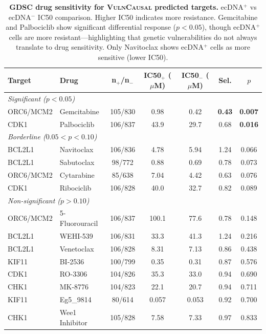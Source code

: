 \documentclass{article}
\newcommand{\vulncausal}{\textsc{VulnCausal}}
\begin{document}
\begin{table}[H]
\caption{\textbf{GDSC drug sensitivity for \vulncausal{} predicted targets.} ecDNA$^+$ vs ecDNA$^-$ IC50 comparison. Higher IC50 indicates more resistance. Gemcitabine and Palbociclib show significant differential response ($p < 0.05$), though ecDNA$^+$ cells are more resistant---highlighting that genetic vulnerabilities do not always translate to drug sensitivity. Only Navitoclax shows ecDNA$^+$ cells as more sensitive (lower IC50).}
\label{tab:gdsc_full}
\centering
\small
\begin{tabular}{@{}llccccc@{}}
\toprule
Target & Drug & n$_{+}$/n$_{-}$ & IC50$_{+}$ ($\mu$M) & IC50$_{-}$ ($\mu$M) & Sel. & $p$ \\
\midrule
\multicolumn{7}{l}{\textit{Significant ($p < 0.05$)}} \\
ORC6/MCM2 & Gemcitabine & 105/830 & 0.98 & 0.42 & \textbf{0.43} & \textbf{0.007} \\
CDK1 & Palbociclib & 106/837 & 43.9 & 29.7 & 0.68 & \textbf{0.016} \\
\midrule
\multicolumn{7}{l}{\textit{Borderline ($0.05 < p < 0.10$)}} \\
BCL2L1 & Navitoclax & 106/836 & 4.78 & 5.94 & 1.24 & 0.066 \\
BCL2L1 & Sabutoclax & 98/772 & 0.88 & 0.69 & 0.78 & 0.073 \\
ORC6/MCM2 & Cytarabine & 85/638 & 7.04 & 4.42 & 0.63 & 0.076 \\
CDK1 & Ribociclib & 106/828 & 40.0 & 32.7 & 0.82 & 0.089 \\
\midrule
\multicolumn{7}{l}{\textit{Non-significant ($p > 0.10$)}} \\
ORC6/MCM2 & 5-Fluorouracil & 106/837 & 100.1 & 77.6 & 0.78 & 0.148 \\
BCL2L1 & WEHI-539 & 106/831 & 33.3 & 41.3 & 1.24 & 0.216 \\
BCL2L1 & Venetoclax & 106/828 & 8.31 & 7.13 & 0.86 & 0.438 \\
KIF11 & BI-2536 & 100/799 & 0.35 & 0.31 & 0.87 & 0.576 \\
CDK1 & RO-3306 & 104/826 & 35.3 & 33.0 & 0.94 & 0.690 \\
CHK1 & MK-8776 & 104/823 & 22.1 & 20.7 & 0.94 & 0.711 \\
KIF11 & Eg5\_9814 & 80/614 & 0.057 & 0.053 & 0.92 & 0.700 \\
CHK1 & Wee1 Inhibitor & 105/828 & 7.58 & 7.33 & 0.97 & 0.833 \\
\bottomrule
\end{tabular}
\end{table}
\end{document}
